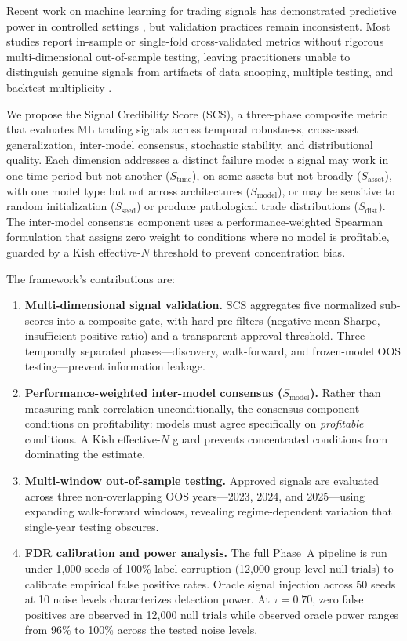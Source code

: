 \documentclass[12pt,a4paper]{article}
\begin{document}
Recent work on machine learning for trading signals has demonstrated predictive power in controlled settings \citep{gu2020empirical, krauss2017deep}, but validation practices remain inconsistent. Most studies report in-sample or single-fold cross-validated metrics without rigorous multi-dimensional out-of-sample testing, leaving practitioners unable to distinguish genuine signals from artifacts of data snooping, multiple testing, and backtest multiplicity \citep{harvey2015backtesting, bailey2014deflated}.

We propose the Signal Credibility Score (SCS), a three-phase composite metric that evaluates ML trading signals across temporal robustness, cross-asset generalization, inter-model consensus, stochastic stability, and distributional quality. Each dimension addresses a distinct failure mode: a signal may work in one time period but not another ($S_{\text{time}}$), on some assets but not broadly ($S_{\text{asset}}$), with one model type but not across architectures ($S_{\text{model}}$), or may be sensitive to random initialization ($S_{\text{seed}}$) or produce pathological trade distributions ($S_{\text{dist}}$). The inter-model consensus component uses a performance-weighted Spearman formulation that assigns zero weight to conditions where no model is profitable, guarded by a Kish effective-$N$ threshold \citep{kish1965survey} to prevent concentration bias.

The framework's contributions are:

\begin{enumerate}
  \item \textbf{Multi-dimensional signal validation.} SCS aggregates five normalized sub-scores into a composite gate, with hard pre-filters (negative mean Sharpe, insufficient positive ratio) and a transparent approval threshold. Three temporally separated phases---discovery, walk-forward, and frozen-model OOS testing---prevent information leakage.
  \item \textbf{Performance-weighted inter-model consensus ($S_{\text{model}}$).} Rather than measuring rank correlation unconditionally, the consensus component conditions on profitability: models must agree specifically on \emph{profitable} conditions. A Kish effective-$N$ guard prevents concentrated conditions from dominating the estimate.
  \item \textbf{Multi-window out-of-sample testing.} Approved signals are evaluated across three non-overlapping OOS years---2023, 2024, and 2025---using expanding walk-forward windows, revealing regime-dependent variation that single-year testing obscures.
  \item \textbf{FDR calibration and power analysis.} The full Phase~A pipeline is run under 1{,}000 seeds of 100\% label corruption (12{,}000 group-level null trials) to calibrate empirical false positive rates. Oracle signal injection across 50 seeds at 10 noise levels characterizes detection power. At $\tau=0.70$, zero false positives are observed in 12{,}000 null trials while observed oracle power ranges from 96\% to 100\% across the tested noise levels.
\end{enumerate}
\end{document}
